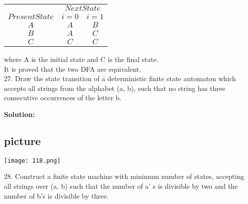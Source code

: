 \documentclass{article}
\begin{document}
  \vspace*{0.2cm}
  \begin{center}
\begin{tabular}{ccc}
 \hline

 \hline

 \hline

 \hline
 & \multicolumn{2}{c}{$Next State$}\\
 \cline{2-3}
 $Present State$ &  $i=0$ & $i=1$\\
\hline
 $A$   &   $A$      &  $B$ \\
 $B$   &   $A$      &  $C$   \\
 $C$   &   $C$      &  $C$   \\
 \hline

 \hline

 \hline

 \hline
\end{tabular}
\end{center}

\vspace*{0.2cm}
where A is the initial state and C is the final state.\\
 \hspace*{0.5cm} It is proved that the two DFA are equivalent.\\
 
 27. Draw the state transition of a deterministic finite state automaton which accepts all strings from
the alphabet (a, b), such that no string has three consecutive occurrences of the letter b.\\
\begin{flushright}
  [GATE 1993]
\end{flushright}


\textbf{Solution:}\\

\begin{center}
\section{picture}
\texttt{[image: 118.png]}
\end{center}


28. Construct a finite state machine with minimum number of states, accepting all strings over (a, b)
such that the number of a' s is divisible by two and the number of b's is divisible by three.\\
\begin{flushright}
  [GATE 1997]
\end{flushright}
\end{document}

